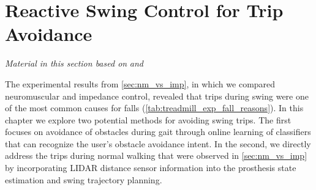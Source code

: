 \chapter{Reactive Swing Control for Trip Avoidance}\label{sec:trip_avoidance}
\graphicspath{{chapters/trip_avoidance/figures/}}

\emph{Material in this section based on}
\citet{gordon2019online}\cite{gordon2019online} \emph{and}
\citet{thatte2019realtime}\cite{thatte2019realtime} \linebreak

The experimental results from \cref{sec:nm_vs_imp}, in which we compared
neuromuscular and impedance control, revealed that trips during swing were one
of the most common causes for falls (\cref{tab:treadmill_exp_fall_reasons}). In
this chapter we explore two potential methods for avoiding swing trips. The
first focuses on avoidance of obstacles during gait through online learning of
classifiers that can recognize the user's obstacle avoidance intent. In the
second, we directly address the trips during normal walking that were observed
in \cref{sec:nm_vs_imp} by incorporating LIDAR distance sensor information into
the prosthesis state estimation and swing trajectory planning.










